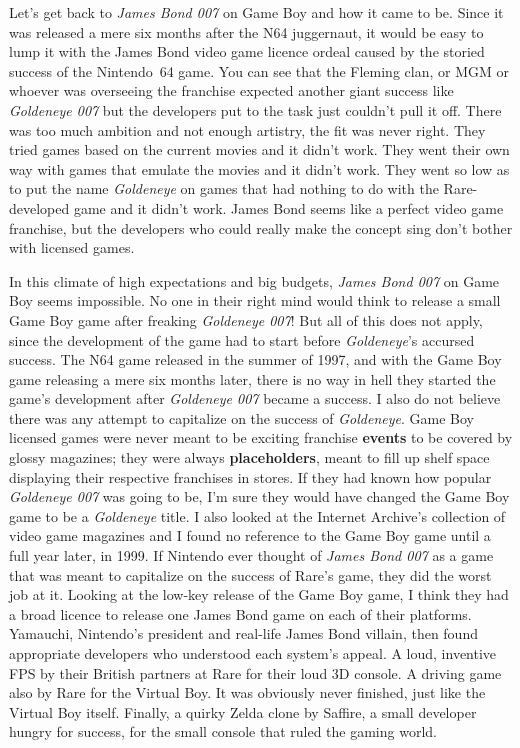 \documentclass{book}
\begin{document}
Let’s get back to \emph{James Bond 007} on Game Boy and how it came to be. Since it was released a mere six months after the N64 juggernaut, it would be easy to lump it with the James Bond video game licence ordeal caused by the storied success of the Nintendo~64 game. You can see that the Fleming clan, or MGM or whoever was overseeing the franchise expected another giant success like \emph{Goldeneye 007} but the developers put to the task just couldn’t pull it off. There was too much ambition and not enough artistry, the fit was never right. They tried games based on the current movies and it didn’t work. They went their own way with games that emulate the movies and it didn’t work. They went so low as to put the name \emph{Goldeneye} on games that had nothing to do with the Rare-developed game and it didn’t work. James Bond seems like a perfect video game franchise, but the developers who could really make the concept sing don’t bother with licensed games.\par
In this climate of high expectations and big budgets, \emph{James Bond 007} on Game Boy seems impossible. No one in their right mind would think to release a small Game Boy game after freaking \emph{Goldeneye 007}! But all of this does not apply, since the development of the game had to start before \emph{Goldeneye}’s accursed success. The N64 game released in the summer of 1997, and with the Game Boy game releasing a mere six months later, there is no way in hell they started the game’s development after \emph{Goldeneye 007} became a success. I also do not believe there was any attempt to capitalize on the success of \emph{Goldeneye}. Game Boy licensed games were never meant to be exciting franchise \textbf{events} to be covered by glossy magazines; they were always \textbf{placeholders}, meant to fill up shelf space displaying their respective franchises in stores. If they had known how popular \emph{Goldeneye 007} was going to be, I’m sure they would have changed the Game Boy game to be a \emph{Goldeneye} title. I also looked at the Internet Archive’s collection of video game magazines and I found no reference to the Game Boy game until a full year later, in 1999. If Nintendo ever thought of \emph{James Bond 007} as a game that was meant to capitalize on the success of Rare’s game, they did the worst job at it. Looking at the low-key release of the Game Boy game, I think they had a broad licence to release one James Bond game on each of their platforms. Yamauchi, Nintendo’s president and real-life James Bond villain, then found appropriate developers who understood each system’s appeal. A loud, inventive FPS by their British partners at Rare for their loud 3D console. A driving game also by Rare for the Virtual Boy. It was obviously never finished, just like the Virtual Boy itself. Finally, a quirky Zelda clone by Saffire, a small developer hungry for success, for the small console that ruled the gaming world.\par
\end{document}
